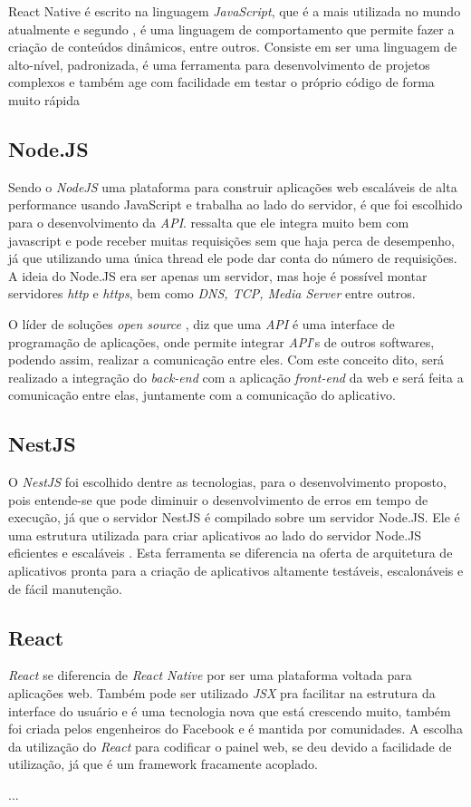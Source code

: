 React Native é escrito na linguagem \textit{JavaScript}, que é a mais utilizada no mundo atualmente e segundo , é uma linguagem de comportamento que permite fazer a criação de conteúdos dinâmicos, entre outros. Consiste em ser uma linguagem de alto-nível, padronizada, é uma ferramenta para desenvolvimento de projetos complexos e também age com facilidade em testar o próprio código de forma muito rápida 

\subsection{Node.JS}
Sendo o \textit{NodeJS} uma plataforma para construir aplicações web escaláveis de alta performance usando JavaScript e trabalha ao lado do servidor, é que foi escolhido para o desenvolvimento da \textit{API}.  ressalta que ele integra muito bem com javascript e pode receber muitas requisições sem que haja perca de desempenho, já que utilizando uma única thread ele pode dar conta do número de requisições. A ideia do Node.JS era ser apenas um servidor, mas hoje é possível montar servidores \textit{http} e \textit{https}, bem como \textit{DNS, TCP, Media Server} entre outros.

O líder de soluções \textit{open source} , diz que uma \textit{API} é uma interface de programação de aplicações, onde permite integrar \textit{API}'s de outros softwares, podendo assim, realizar a comunicação entre eles. Com este conceito dito, será realizado a integração do \textit{back-end} com a aplicação \textit{front-end} da web e será feita a comunicação entre elas, juntamente com a comunicação do aplicativo.

\subsection{NestJS}
O \textit{NestJS} foi escolhido dentre as tecnologias, para o desenvolvimento proposto, pois entende-se que pode diminuir o desenvolvimento de erros em tempo de execução, já que o servidor NestJS é compilado sobre um servidor Node.JS. Ele é uma estrutura utilizada para criar aplicativos ao lado do servidor Node.JS eficientes e escaláveis . Esta ferramenta se diferencia na oferta de arquitetura de aplicativos pronta para a criação de aplicativos altamente testáveis, escalonáveis e de fácil manutenção.

\subsection{React}
\textit{React} se diferencia de \textit{React Native} por ser uma plataforma voltada para aplicações web. Também pode ser utilizado \textit{JSX} pra facilitar na estrutura da interface do usuário e é uma tecnologia nova que está crescendo muito, também foi criada pelos engenheiros do Facebook e é mantida por comunidades. A escolha da utilização do \textit{React} para codificar o painel web, se deu devido a facilidade de utilização, já que é um framework fracamente acoplado.




...